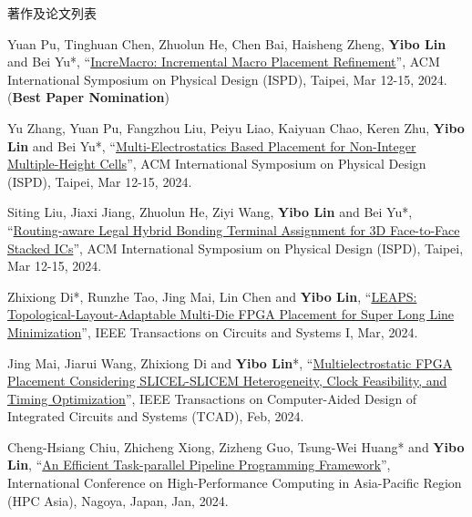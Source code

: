 \begin{rSection}{著作及论文列表}
\begin{description}[font=\normalfont, rightmargin=2em]
{}
            

\item[{[C140]}]{
        Yuan Pu, Tinghuan Chen, Zhuolun He, Chen Bai, Haisheng Zheng, \textbf{Yibo Lin} and Bei Yu*, 
    ``\href{https://doi.org/10.1145/3626184.3633321}{IncreMacro: Incremental Macro Placement Refinement}'', 
    ACM International Symposium on Physical Design (ISPD), Taipei, Mar 12-15, 2024.
    (\textbf{Best Paper Nomination})
}
            

\item[{[C139]}]{
        Yu Zhang, Yuan Pu, Fangzhou Liu, Peiyu Liao, Kaiyuan Chao, Keren Zhu, \textbf{Yibo Lin} and Bei Yu*, 
    ``\href{https://doi.org/10.1145/3626184.3633320}{Multi-Electrostatics Based Placement for Non-Integer Multiple-Height Cells}'', 
    ACM International Symposium on Physical Design (ISPD), Taipei, Mar 12-15, 2024.
    
}
            

\item[{[C138]}]{
        Siting Liu, Jiaxi Jiang, Zhuolun He, Ziyi Wang, \textbf{Yibo Lin} and Bei Yu*, 
    ``\href{https://doi.org/10.1145/3626184.3633322}{Routing-aware Legal Hybrid Bonding Terminal Assignment for 3D Face-to-Face Stacked ICs}'', 
    ACM International Symposium on Physical Design (ISPD), Taipei, Mar 12-15, 2024.
    
}
            

\item[{[J137]}]{
        Zhixiong Di*, Runzhe Tao, Jing Mai, Lin Chen and \textbf{Yibo Lin}, 
    ``\href{https://doi.org/10.1109/TCSI.2023.3340554}{LEAPS: Topological-Layout-Adaptable Multi-Die FPGA Placement for Super Long Line Minimization}'', 
    IEEE Transactions on Circuits and Systems I, Mar, 2024.
    
}
            

\item[{[J136]}]{
        Jing Mai, Jiarui Wang, Zhixiong Di and \textbf{Yibo Lin}*, 
    ``\href{https://doi.org/10.1109/TCAD.2023.3313101}{Multielectrostatic FPGA Placement Considering SLICEL-SLICEM Heterogeneity, Clock Feasibility, and Timing Optimization}'', 
    IEEE Transactions on Computer-Aided Design of Integrated Circuits and Systems (TCAD), Feb, 2024.
    
}
            

\item[{[C135]}]{
        Cheng-Hsiang Chiu, Zhicheng Xiong, Zizheng Guo, Tsung-Wei Huang* and \textbf{Yibo Lin}, 
    ``\href{https://doi.org/10.1145/3635035.3635037}{An Efficient Task-parallel Pipeline Programming Framework}'', 
    International Conference on High-Performance Computing in Asia-Pacific Region (HPC Asia), Nagoya, Japan, Jan, 2024.
    
}
\end{description}
\end{rSection}
